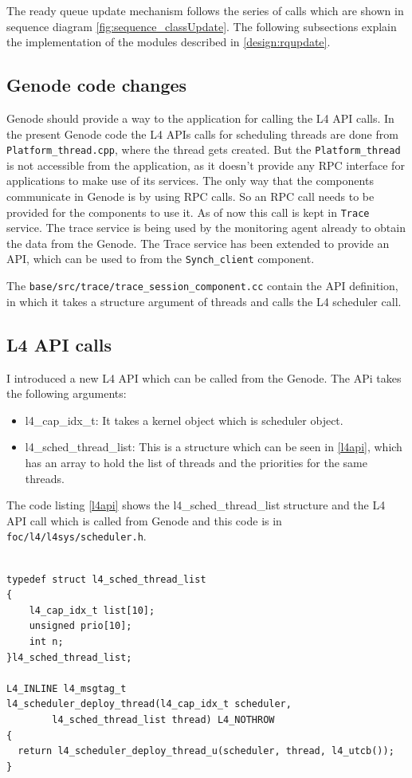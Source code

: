 The ready queue update mechanism follows the series of calls which are shown in sequence diagram \ref{fig:sequence_classUpdate}. The following subsections explain the implementation of the modules described in \ref{design:rqupdate}.

\subsection{Genode code changes}

Genode should provide a way to the application for calling the L4 API calls. In the present Genode code the L4 APIs calls for scheduling threads are done from \texttt{Platform\_thread.cpp}, where the thread gets created. But the \texttt{Platform\_thread} is not accessible from the application, as it doesn't provide any RPC interface for applications to make use of its services. The only way that the components communicate in Genode is by using RPC calls. So an RPC call needs to be provided for the components to use it. As of now this call is kept in \texttt{Trace} service. The trace service is being used by the monitoring agent already to obtain the data from the Genode. The Trace service has been extended to provide an API, which can be used to from the \texttt{Synch\_client} component.

The \texttt{base/src/trace/trace\_session\_component.cc} contain the API definition, in which it takes a structure argument of threads and calls the L4 scheduler call.

\subsection{L4 API calls} \label{imp:l4api}
I introduced a new L4 API which can be called from the Genode. The APi takes the following arguments:

\begin{itemize}
\item l4\_cap\_idx\_t: It takes a kernel object which is scheduler object.  

\item l4\_sched\_thread\_list: This is a structure which can be seen in \ref{l4api}, which has an array to hold the list of threads and the priorities for the same threads. 

\end{itemize}

The code listing  \ref{l4api} shows the l4\_sched\_thread\_list structure and the L4 API call which is called from Genode and this code is in \texttt{foc/l4/l4sys/scheduler.h}.
\begin{lstlisting}[caption={L4 scheduler API in scheduler.h},label={l4api}, style=customcpp]

typedef struct l4_sched_thread_list
{
	l4_cap_idx_t list[10];
	unsigned prio[10];
	int n;
}l4_sched_thread_list;

L4_INLINE l4_msgtag_t
l4_scheduler_deploy_thread(l4_cap_idx_t scheduler,
		l4_sched_thread_list thread) L4_NOTHROW
{
  return l4_scheduler_deploy_thread_u(scheduler, thread, l4_utcb());
}
\end{lstlisting}

